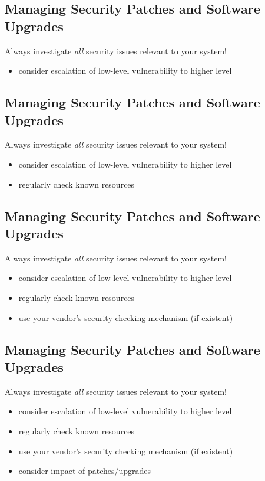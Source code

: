\documentclass[xga]{xdvislides}
\begin{document}
\subsection{Managing Security Patches and Software Upgrades}
Always investigate {\em all} security issues relevant to your system!
\begin{itemize}
	\item consider escalation of low-level vulnerability to higher level
\end{itemize}

\subsection{Managing Security Patches and Software Upgrades}
Always investigate {\em all} security issues relevant to your system!
\begin{itemize}
	\item consider escalation of low-level vulnerability to higher level
	\item regularly check known resources
\end{itemize}

\subsection{Managing Security Patches and Software Upgrades}
Always investigate {\em all} security issues relevant to your system!
\begin{itemize}
	\item consider escalation of low-level vulnerability to higher level
	\item regularly check known resources
	\item use your vendor's security checking mechanism (if existent)
\end{itemize}

\subsection{Managing Security Patches and Software Upgrades}
Always investigate {\em all} security issues relevant to your system!
\begin{itemize}
	\item consider escalation of low-level vulnerability to higher level
	\item regularly check known resources
	\item use your vendor's security checking mechanism (if existent)
	\item consider impact of patches/upgrades
\end{itemize}
\end{document}

